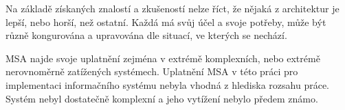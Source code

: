 Na základě získaných znalostí a zkušeností nelze říct, že nějaká z architektur je lepší, nebo horší, než ostatní.
Každá má svůj účel a svoje potřeby, může být různě kongurována a upravována dle situací, ve kterých se nechází.

\gls{MSA} najde svoje uplatnění zejména v extrémě komplexních, nebo extrémě nerovnoměrně zatížených systémech.
Uplatnění \gls{MSA} v této práci pro implementaci informačního systému nebyla vhodná z hlediska rozsahu práce.
Systém nebyl dostatečně komplexní a jeho vytížení nebylo předem známo.
